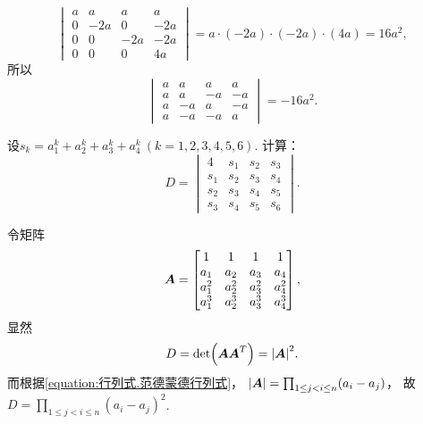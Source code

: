 \begin{example}
\begin{solution}
\begin{equation*}
	\begin{vmatrix}
		a & a & a & a \\
		0 & -2 a & 0 & -2 a \\
		0 & 0 & -2 a & -2 a \\
		0 & 0 & 0 & 4 a
	\end{vmatrix}
	= a\cdot(-2a)\cdot(-2a)\cdot(4a) = 16a^2,
\end{equation*}
所以\begin{equation*}
	\begin{vmatrix}
		a & a & a & a \\
		a & a & -a & -a \\
		a & -a & a & -a \\
		a & -a & -a & a
	\end{vmatrix}
	= -16a^2.
\end{equation*}
\end{solution}
\end{example}

\begin{example}
设\(s_k = a_1^k + a_2^k + a_3^k + a_4^k\ (k=1,2,3,4,5,6)\).
计算：\begin{equation*}
	D = \begin{vmatrix}
		4 & s_1 & s_2 & s_3 \\
		s_1 & s_2 & s_3 & s_4 \\
		s_2 & s_3 & s_4 & s_5 \\
		s_3 & s_4 & s_5 & s_6
	\end{vmatrix}.
\end{equation*}
\begin{solution}
令矩阵\begin{equation*}
	\boldsymbol{A} = \begin{bmatrix}
		1 & 1 & 1 & 1 \\
		a_1 & a_2 & a_3 & a_4 \\
		a_1^2 & a_2^2 & a_3^2 & a_4^2 \\
		a_1^3 & a_2^3 & a_3^3 & a_4^3
	\end{bmatrix},
\end{equation*}
显然\begin{equation*}
	D = \det(\boldsymbol{A} \boldsymbol{A}^T) = \abs{\boldsymbol{A}}^2.
\end{equation*}
而根据\cref{equation:行列式.范德蒙德行列式}，
\(\abs{\boldsymbol{A}}
= \prod_{1 \leq j < i \leq n} (a_i - a_j)\)，
故\(D = \prod_{1 \leq j < i \leq n} (a_i - a_j)^2\).
\end{solution}
\end{example}
